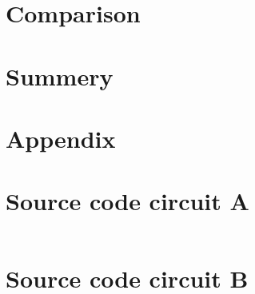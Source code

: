 \documentclass[notitlepage, a4paper, 11pt]{article}
\begin{document}
	\section{Comparison}
	\section{Summery}
	\newpage
	\appendix
	\section*{Appendix}\label{Appendix}
	\section{Source code circuit A}
	\inputminted{python}{../CircuitA.py}
	\label{code:A}
	\newpage
	\section{Source code circuit B}
	\inputminted{python}{../CircuitB.py}
	\label{code:B}
\end{document}
